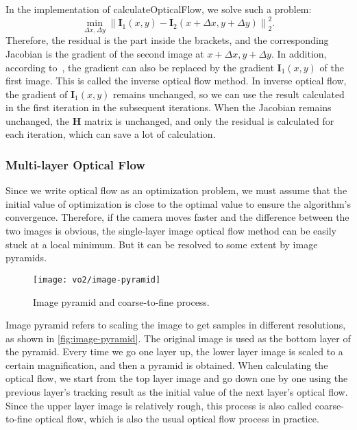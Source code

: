 In the implementation of calculateOpticalFlow, we solve such a problem:
\begin{equation}
\mathop {\min }\limits_{\Delta x,\Delta y} \left\| {{\mathbf{I}_1}\left( {x,y} \right) - {\mathbf{I}_2}\left( {x + \Delta x,y + \Delta y} \right)} \right\|_2^2.
\end{equation}
Therefore, the residual is the part inside the brackets, and the corresponding Jacobian is the gradient of the second image at $x + \Delta x,y + \Delta y$. In addition, according to~\cite{Baker2004}, the gradient can also be replaced by the gradient $\mathbf{I}_1 (x,y)$ of the first image. This is called the inverse optical flow method. In inverse optical flow, the gradient of $\mathbf{I}_1 (x,y)$ remains unchanged, so we can use the result calculated in the first iteration in the subsequent iterations. When the Jacobian remains unchanged, the $\mathbf{H}$ matrix is unchanged, and only the residual is calculated for each iteration, which can save a lot of calculation.

\subsubsection{Multi-layer Optical Flow}
Since we write optical flow as an optimization problem, we must assume that the initial value of optimization is close to the optimal value to ensure the algorithm's convergence. Therefore, if the camera moves faster and the difference between the two images is obvious, the single-layer image optical flow method can be easily stuck at a local minimum. But it can be resolved to some extent by image pyramids.

\begin{figure}[!htp]
	\centering
	\texttt{[image: vo2/image-pyramid]}
	\caption{Image pyramid and coarse-to-fine process.}
	\label{fig:image-pyramid}
\end{figure}

Image pyramid refers to scaling the image to get samples in different resolutions, as shown in \autoref{fig:image-pyramid}. The original image is used as the bottom layer of the pyramid. Every time we go one layer up, the lower layer image is scaled to a certain magnification, and then a pyramid is obtained. When calculating the optical flow, we start from the top layer image and go down one by one using the previous layer's tracking result as the initial value of the next layer's optical flow. Since the upper layer image is relatively rough, this process is also called coarse-to-fine optical flow, which is also the usual optical flow process in practice.

